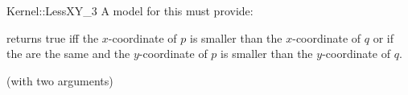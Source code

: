 \begin{ccRefFunctionObjectConcept}{Kernel::LessXY_3}
A model for this must provide:


{returns true iff the $x$-coordinate of $p$ is smaller than the
$x$-coordinate of $q$ or if the are the same and 
the $y$-coordinate of $p$ is smaller than the $y$-coordinate of $q$.}

\ccRefines
{} (with two arguments)

\ccSeeAlso
{}\\

\end{ccRefFunctionObjectConcept}
